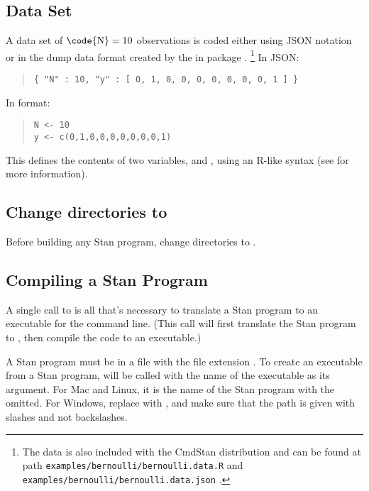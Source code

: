\subsection{Data Set}

A data set of $\mbox{\code{N}}=10$ observations is coded either
using JSON notation or in the dump data format created by
the  in package .
%
\footnote{
The data is also included with the CmdStan distribution and can be found at path
\nolinkurl{examples/bernoulli/bernoulli.data.R} and \nolinkurl{examples/bernoulli/bernoulli.data.json} .
}
In JSON:
%
\begin{quote}
\begin{Verbatim}
{ "N" : 10, "y" : [ 0, 1, 0, 0, 0, 0, 0, 0, 0, 1 ] }
\end{Verbatim}
\end{quote}
%
In  format:
%
\begin{quote}
\begin{Verbatim}
N <- 10
y <- c(0,1,0,0,0,0,0,0,0,1)
\end{Verbatim}
\end{quote}
%
This defines the contents of two variables,  and ,
using an R-like syntax (see  for more information).

\subsection{Change directories to }

Before building any Stan program, change directories to .

\subsection{Compiling a Stan Program}

A single call to  is all that's necessary to translate a
Stan program to an executable for the command line. (This call will
first translate the Stan program to \Cpp, then compile the \Cpp code
to an executable.)

A Stan program must be in a file with the file extension
. To create an executable from a Stan program, 
will be called with the name of the executable as its argument. For
Mac and Linux, it is the name of the Stan program with the
 omitted. For Windows, replace  with ,
and make sure that the path is given with slashes and not backslashes.

